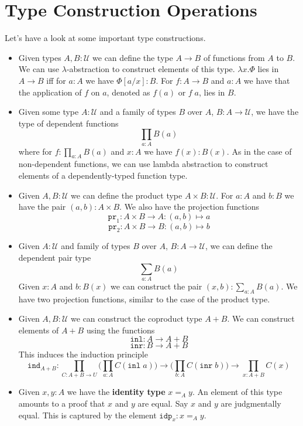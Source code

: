 \documentclass[12pt]{report}
\begin{document}
\section{Type Construction Operations}
Let's have a look at some important type constructions.
\begin{itemize}
	\item Given types $A, B : \mathcal{U}$ we can define the type $A \rightarrow B$ of functions from $A$ to $B$. 
		We can use $\lambda$-abstraction to construct elements of this type. $\lambda x. \Phi$ lies in $A \rightarrow B$ iff for $a : A$ we have $\Phi[a/x] : B$. 
		For $f : A \rightarrow B$ and $a : A$ we have that the application of $f$ on $a$, denoted as $f(a)$ or $f\;a$, lies in $B$.
	\item Given some type $A : \mathcal{U}$ and a family of types $B$ over $A$, $B : A \rightarrow \mathcal{U}$, we have the type of dependent functions $$\prod_{a : A} B(a)$$
	where for $f : \prod_{a : A} B(a)$ and $x : A$ we have $f(x) : B(x)$. 
	As in the case of non-dependent functions, we can use lambda abstraction to construct elements of a dependently-typed function type.
	\item Given $A, B : \mathcal{U}$ we can define the product type $A \times B : \mathcal{U}$. 
	For $a : A$ and $b : B$ we have the pair $(a,b) : A \times B$. 
	We also have the projection functions 
	$$\mathtt{pr}_1 : A \times B \rightarrow A : (a,b) \mapsto a$$
	$$\mathtt{pr}_2 : A \times B \rightarrow B : (a,b) \mapsto b$$
	\item Given $A : \mathcal{U}$ and family of types $B$ over $A$, $B : A \rightarrow \mathcal{U}$, we can define the dependent pair type $$\sum_{a : A} B(a)$$
	Given $x : A$ and $b : B(x)$ we can construct the pair $(x,b) : \sum_{a : A} B(a)$. 
	We have two projection functions, similar to the case of the product type.
	\item Given $A, B : \mathcal{U}$ we can construct the coproduct type $A + B$. 
	We can construct elements of $A + B$ using the functions
	$$\mathtt{inl} : A \rightarrow A+B$$
	$$\mathtt{inr} : B \rightarrow A+B$$
	This induces the induction principle
	$$\mathtt{ind}_{A+B} : \prod_{C : A+B \rightarrow U} \Big(\prod_{a : A}C(\mathtt{inl}\;a)\Big) \rightarrow \Big(\prod_{b : A}C(\mathtt{inr}\;b)\Big) \rightarrow \prod_{x : A+ B}C(x)$$
	\item Given $x, y : A$ we have the \textbf{identity type} $x =_A y$. 
	An element of this type amounts to a proof that $x$ and $y$ are equal. 
	Say $x$ and $y$ are judgmentally equal. 
	This is captured by the element $\mathtt{idp}_x : x =_A y$. 

\end{itemize}
\end{document}
